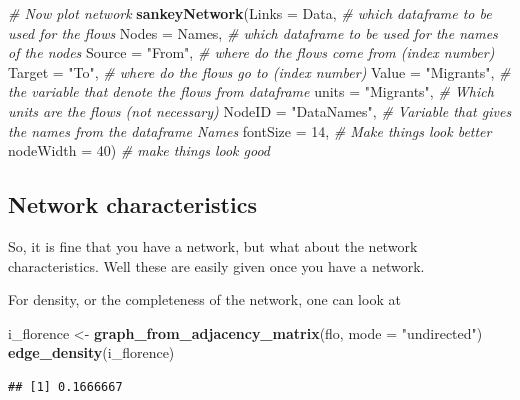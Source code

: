 \documentclass[]{article}
\newenvironment{Shaded}{\begin{snugshade}}{\end{snugshade}}
\newcommand{\KeywordTok}[1]{\textcolor[rgb]{0.13,0.29,0.53}{\textbf{#1}}}
\newcommand{\DataTypeTok}[1]{\textcolor[rgb]{0.13,0.29,0.53}{#1}}
\newcommand{\DecValTok}[1]{\textcolor[rgb]{0.00,0.00,0.81}{#1}}
\newcommand{\StringTok}[1]{\textcolor[rgb]{0.31,0.60,0.02}{#1}}
\newcommand{\CommentTok}[1]{\textcolor[rgb]{0.56,0.35,0.01}{\textit{#1}}}
\newcommand{\NormalTok}[1]{#1}
\theoremstyle{definition}
\theoremstyle{definition}
\theoremstyle{definition}
\theoremstyle{remark}
\begin{document}
\begin{Shaded}
\begin{Highlighting}[]
\CommentTok{# Now plot network}
\KeywordTok{sankeyNetwork}\NormalTok{(}\DataTypeTok{Links =}\NormalTok{ Data, }\CommentTok{# which dataframe to be used for the flows}
              \DataTypeTok{Nodes =}\NormalTok{ Names, }\CommentTok{# which dataframe to be used for the names of the nodes}
              \DataTypeTok{Source =} \StringTok{"From"}\NormalTok{, }\CommentTok{# where do the flows come from (index number)}
              \DataTypeTok{Target =} \StringTok{"To"}\NormalTok{,  }\CommentTok{# where do the flows go to (index number)}
              \DataTypeTok{Value =} \StringTok{"Migrants"}\NormalTok{, }\CommentTok{# the variable that denote the flows from dataframe}
              \DataTypeTok{units =} \StringTok{"Migrants"}\NormalTok{, }\CommentTok{# Which units are the flows (not necessary)}
              \DataTypeTok{NodeID =} \StringTok{"DataNames"}\NormalTok{, }\CommentTok{# Variable that gives the names from the dataframe Names }
              \DataTypeTok{fontSize =} \DecValTok{14}\NormalTok{,  }\CommentTok{# Make things look better}
              \DataTypeTok{nodeWidth =} \DecValTok{40}\NormalTok{) }\CommentTok{# make things look good}
\end{Highlighting}
\end{Shaded}

\hypertarget{htmlwidget-6b6f5ccaa6a235481340}{}

\subsection{Network characteristics}\label{network-characteristics}

So, it is fine that you have a network, but what about the network
characteristics. Well these are easily given once you have a network.

For density, or the completeness of the network, one can look at

\begin{Shaded}
\begin{Highlighting}[]
\NormalTok{ i_florence <-}\StringTok{ }\KeywordTok{graph_from_adjacency_matrix}\NormalTok{(flo, }\DataTypeTok{mode =} \StringTok{"undirected"}\NormalTok{)}
 \KeywordTok{edge_density}\NormalTok{(i_florence)}
\end{Highlighting}
\end{Shaded}

\begin{verbatim}
## [1] 0.1666667
\end{verbatim}
\end{document}
